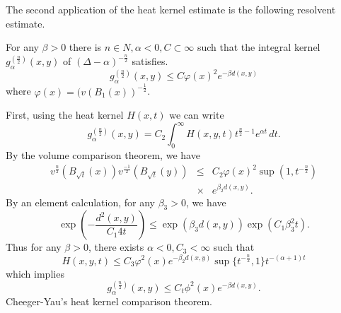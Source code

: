 The second application of the heat kernel estimate is the following resolvent estimate.

\begin{theorem} For any $ \beta > 0 $ there is $ n \in N, \alpha < 0 , C \subset \infty $ such that the integral kernel $ g _{\alpha} ^{(\frac{n}{2})}(x, y) $ of $(\Delta - \alpha) ^{-\frac{n}{2}} $ satisfies.
%
\[g _{\alpha} ^{(\frac{n}{2})}(x, y)  \leq C \varphi (x) ^2 e ^{-\beta d(x, y)}\]
%
where $ \varphi (x) = (v (B_1 (x))  ^{-\frac{1}{2}} $.
\end{theorem}
 First, using the heat kernel $ H (x, t)$ we can write 
%
\[g _{\alpha} ^{(\frac{n}{2})}(x, y) = C _2 \int ^\infty_0 H (x, y, t) t  ^{ \frac{n}{2}-1   } e ^{\alpha t} \, dt.\]
%
By the volume comparison theorem, we have 
%
\begin{eqnarray*}
v ^{ \frac{n}{2}} (B_{\sqrt{t}}(x)) v ^{ \frac{-1}{2} }(B_{\sqrt{t}}(y))&\leq & C_2 \varphi (x)^2 \sup (1, t  ^{-\frac{n}{2}})\\
 &\times & e ^{\beta _{2} d (x, y)}. \end{eqnarray*}
By an element calculation, for any $\beta _3 > 0 $, we have 
%
\[\exp \left( - \frac{d^2 (x, y)}{C_1 4t} \right) \leq \exp (  \beta_3 d (x, y) ) \exp (C_1 \beta ^2_3 t ). \]
%
Thus for any $ \beta > 0 $, there exists $ \alpha < 0 , C_3 < \infty $ such that 
%
\[ H (x, y, t) \leq C_3 \varphi ^2 (x) e ^{-\beta _{2} d (x, y)} \sup \{ t  ^{ -\frac{n}{2} } , 1 \} t  ^{ - (\alpha + 1 ) t} \]
%
which implies 
%
\[g _{\alpha} ^{(\frac{n}{2})}  (x, y) \leq C_t \phi ^2 (x)   e ^{-\beta  d (x, y)}.\]
%
Cheeger-Yau's heat kernel comparison theorem. 

